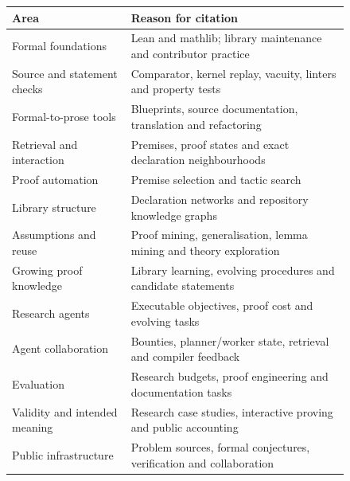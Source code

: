\documentclass[10pt]{article}
\begin{document}
\begin{figure}[H]
\centering\small
\begin{tabularx}{\linewidth}{@{}>{\raggedright\arraybackslash}p{3.8cm}>{\raggedright\arraybackslash}X@{}}
\toprule
Area & Reason for citation\\
\midrule
Formal foundations & Lean and mathlib; library maintenance and contributor practice~\cite{lean4,mathlib,growingmathlib,mathlibcontrib}\\
Source and statement checks & Comparator, kernel replay, vacuity, linters and property tests~\cite{leanfrocomparator,nanodalib,beyondvacuity,batteries,plausible}\\
Formal-to-prose tools & Blueprints, source documentation, translation and refactoring~\cite{leanblueprint,leanarchitect,hattori,leanmarathon,proofrefactor,p3docagent}\\
Retrieval and interaction & Premises, proof states and exact declaration neighbourhoods~\cite{leandojo,pantograph,leanexplore,leansearchv2,theoremgraph,leanatlas}\\
Proof automation & Premise selection and tactic search~\cite{leanhammer,aesop,judgementday}\\
Library structure & Declaration networks and repository knowledge graphs~\cite{mathlibnetwork,huch,repokg}\\
Assumptions and reuse & Proof mining, generalisation, lemma mining and theory exploration~\cite{kohlenbach,gandhi,lemmamining,hipster}\\
Growing proof knowledge & Library learning, evolving procedures and candidate statements~\cite{dreamcoder,legoprover,dreamprover,proofevolve,leanconjecturer,circuitprover}\\
Research agents & Executable objectives, proof cost and evolving tasks~\cite{alphaevolve,alphaevolvemath,patel,dreamrsi,berlotattwell}\\
Agent collaboration & Bounties, planner/worker state, retrieval and compiler feedback~\cite{agenthunt,openprover,oprover,prove2me,axle,etp}\\
Evaluation & Research budgets, proof engineering and documentation tasks~\cite{rebench,p6-swd,p6-ape,p6-poiroux,documentationtest,henkel,openproofcorpus}\\
Validity and intended meaning & Research case studies, interactive proving and public accounting~\cite{aletheia,autonomousmath,lihai,taowiki}\\
Public infrastructure & Problem sources, formal conjectures, verification and collaboration~\cite{erdosproblems,formalconjectures,palomar,carleson,polymath,boinc,gimps,credit,githubsecurity}\\

\end{tabularx}
\end{figure}
\end{document}
